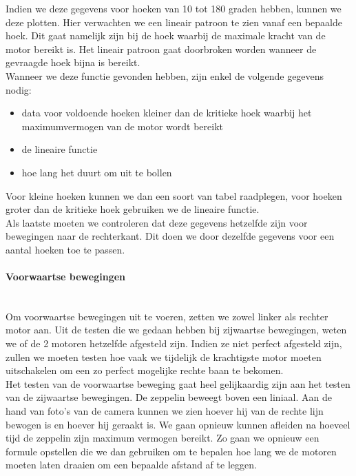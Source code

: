 \documentclass[tt]{penoverslag}
\begin{document}
Indien we deze gegevens voor hoeken van 10 tot 180 graden hebben, kunnen we deze plotten. Hier verwachten we een lineair patroon te zien vanaf een bepaalde hoek. Dit gaat namelijk zijn bij de hoek waarbij de maximale kracht van de motor bereikt is. Het lineair patroon gaat doorbroken worden wanneer de gevraagde hoek bijna is bereikt. \\

Wanneer we deze functie gevonden hebben, zijn enkel de volgende gegevens nodig:
\begin{itemize}
	\item data voor voldoende hoeken kleiner dan de kritieke hoek waarbij het maximumvermogen van de motor wordt bereikt
	\item de lineaire functie
	\item hoe lang het duurt om uit te bollen
\end{itemize}
Voor kleine hoeken kunnen we dan een soort van tabel raadplegen, voor hoeken groter dan de kritieke hoek gebruiken we de lineaire functie. \\

Als laatste moeten we controleren dat deze gegevens hetzelfde zijn voor bewegingen naar de rechterkant.  Dit doen we door dezelfde gegevens voor een aantal hoeken toe te passen. \\

\paragraph{Voorwaartse bewegingen} ~\\ 
Om voorwaartse bewegingen uit te voeren, zetten we zowel linker als rechter motor aan. Uit de testen die we gedaan hebben bij zijwaartse bewegingen, weten we of de 2 motoren hetzelfde afgesteld zijn. Indien ze niet perfect afgesteld zijn, zullen we moeten testen hoe vaak we tijdelijk de krachtigste motor moeten uitschakelen om een zo perfect mogelijke rechte baan te bekomen. \\

Het testen van de voorwaartse beweging gaat heel gelijkaardig zijn aan het testen van de zijwaartse bewegingen.  De zeppelin beweegt boven een liniaal.  Aan de hand van foto's van de camera kunnen we zien hoever hij van de rechte lijn bewogen is en hoever hij geraakt is. We gaan opnieuw kunnen afleiden na hoeveel tijd de zeppelin zijn maximum vermogen bereikt. Zo gaan we opnieuw een formule opstellen die we dan gebruiken om te bepalen hoe lang we de motoren moeten laten draaien om een bepaalde afstand af te leggen. \\
\end{document}
